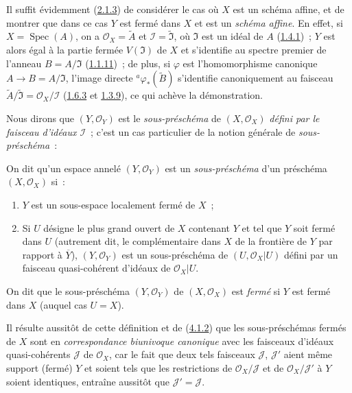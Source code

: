 Il suffit évidemment (\hyperref[I.2.1.3-fr]{2.1.3}) de considérer le cas où
$X$ est un schéma affine, et de montrer que dans ce cas $Y$ est fermé dans
$X$ et est un \emph{schéma affine}. En effet, si
$X=\operatorname{Spec}(A)$, on a $\mathscr{O}_X=\widetilde{A}$ et
$\mathscr{I}=\widetilde{\mathfrak{I}}$, où $\mathfrak{I}$ est un idéal de
$A$ (\hyperref[I.1.4.1-fr]{1.4.1})~; $Y$ est alors égal à la partie fermée
$V(\mathfrak{I})$ de $X$ et s'identifie au spectre premier de l'anneau
$B=A/\mathfrak{I}$ (\hyperref[I.1.1.11-fr]{1.1.11})~; de plus, si $\varphi$
est l'homomorphisme canonique $A\to B=A/\mathfrak{I}$, l'image directe
${}^a\varphi_*(\widetilde{B})$ s'identifie canoniquement au faisceau
$\widetilde{A}/\widetilde{\mathfrak{I}}=\mathscr{O}_X/\mathscr{I}$
(\hyperref[I.1.6.3-fr]{1.6.3} et \hyperref[I.1.3.9-fr]{1.3.9}), ce qui achève
la démonstration.

Nous dirons que $(Y,\mathscr{O}_Y)$ est le \emph{sous-préschéma} de
$(X,\mathscr{O}_X)$ \emph{défini par le faisceau d'idéaux $\mathscr{I}$}~;
c'est un cas particulier de la notion générale de \emph{sous-préschéma}~:

\begin{definition}[4.1.3]
\label{I.4.1.3-fr}
On dit qu'un espace annelé $(Y,\mathscr{O}_Y)$ est un
\emph{sous-préschéma} d'un préschéma $(X,\mathscr{O}_X)$ si~:
\begin{enumerate}
  \item[$1^\circ$] $Y$ est un sous-espace localement fermé de $X$~;
  \item[$2^\circ$] Si $U$ désigne le plus grand ouvert de $X$ contenant $Y$
  et tel que $Y$ soit fermé dans $U$ (autrement dit, le complémentaire dans
  $X$ de la frontière de $Y$ par rapport à $\overline{Y}$),
  $(Y,\mathscr{O}_Y)$ est un sous-préschéma de
  $(U,\mathscr{O}_X|U)$ défini par un faisceau quasi-cohérent d'idéaux de
  $\mathscr{O}_X|U$.
\end{enumerate}
On dit que le sous-préschéma $(Y,\mathscr{O}_Y)$ de $(X,\mathscr{O}_X)$ est
\emph{fermé} si $Y$ est fermé dans $X$ (auquel cas $U=X$).
\end{definition}

Il résulte aussitôt de cette définition et de
(\hyperref[I.4.1.2-fr]{4.1.2}) que les sous-préschémas fermés de $X$ sont en
\emph{correspondance biunivoque canonique} avec les faisceaux d'idéaux
quasi-cohérents $\mathscr{J}$ de $\mathscr{O}_X$, car le fait que deux tels
faisceaux $\mathscr{J}$, $\mathscr{J}'$ aient même support (fermé) $Y$ et
soient tels que les restrictions de $\mathscr{O}_X/\mathscr{J}$ et de
$\mathscr{O}_X/\mathscr{J}'$ à $Y$ soient identiques, entraîne aussitôt que
$\mathscr{J}'=\mathscr{J}$.

